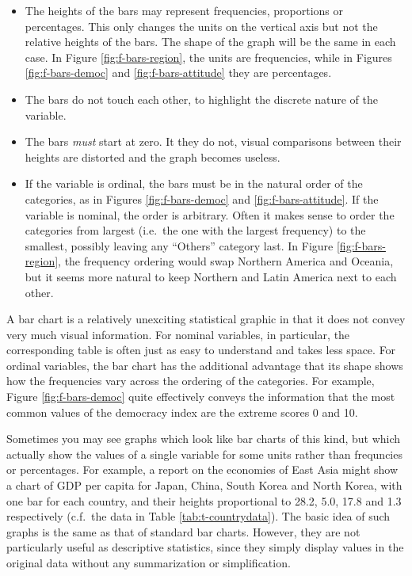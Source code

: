 \documentclass[11pt,a4paper,openany]{book}
\begin{document}
\begin{itemize}
\item
  The heights of the bars may represent frequencies, proportions or
  percentages. This only changes the units on the vertical axis but not
  the relative heights of the bars. The shape of the graph will be the
  same in each case. In Figure \ref{fig:f-bars-region}, the units are
  frequencies, while in Figures \ref{fig:f-bars-democ} and
  \ref{fig:f-bars-attitude} they are percentages.
\item
  The bars do not touch each other, to highlight the discrete nature of
  the variable.
\item
  The bars \emph{must} start at zero. It they do not, visual comparisons
  between their heights are distorted and the graph becomes useless.
\item
  If the variable is ordinal, the bars must be in the natural order of
  the categories, as in Figures \ref{fig:f-bars-democ} and
  \ref{fig:f-bars-attitude}. If the variable is nominal, the order is
  arbitrary. Often it makes sense to order the categories from largest
  (i.e.~the one with the largest frequency) to the smallest, possibly
  leaving any ``Others'' category last. In Figure
  \ref{fig:f-bars-region}, the frequency ordering would swap Northern
  America and Oceania, but it seems more natural to keep Northern and
  Latin America next to each other.
\end{itemize}

A bar chart is a relatively unexciting statistical graphic in that it
does not convey very much visual information. For nominal variables, in
particular, the corresponding table is often just as easy to understand
and takes less space. For ordinal variables, the bar chart has the
additional advantage that its shape shows how the frequencies vary
across the ordering of the categories. For example, Figure
\ref{fig:f-bars-democ} quite effectively conveys the information that
the most common values of the democracy index are the extreme scores 0
and 10.

Sometimes you may see graphs which look like bar charts of this kind,
but which actually show the values of a single variable for some units
rather than frequncies or percentages. For example, a report on the
economies of East Asia might show a chart of GDP per capita for Japan,
China, South Korea and North Korea, with one bar for each country, and
their heights proportional to 28.2, 5.0, 17.8 and 1.3 respectively
(c.f.~the data in Table \ref{tab:t-countrydata}). The basic idea of such
graphs is the same as that of standard bar charts. However, they are not
particularly useful as descriptive statistics, since they simply display
values in the original data without any summarization or simplification.
\end{document}
